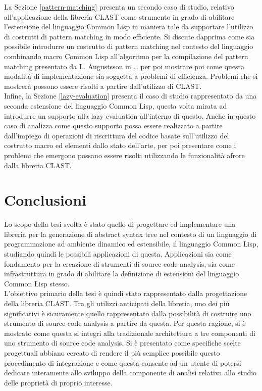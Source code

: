 \documentclass{book}
\begin{document}
La Sezione \ref{pattern-matching} presenta un secondo caso di studio, relativo
all’applicazione della libreria CLAST come strumento in grado di abilitare
l’estensione del linguaggio Common Lisp in maniera tale da supportare l’utilizzo
di costrutti di pattern matching in modo efficiente. Si discute dapprima come
sia possibile introdurre un costrutto di pattern matching nel contesto del
linguaggio combinando macro Common Lisp all’algoritmo per la compilazione del
pattern matching presentato da L. Augustsson in … per poi mostrare poi come
questa modalità di implementazione sia soggetta a problemi di efficienza.
Problemi che si mostrerà possono essere risolti a partire dall'utilizzo di
CLAST.\\

Infine, la Sezione \ref{lazy-evaluation} presenta il caso di studio
rappresentato da una seconda estensione del linguaggio Common Lisp, questa volta
mirata ad introdurre un supporto alla lazy evaluation all’interno di questo.
Anche in questo caso di analizza come questo supporto possa essere realizzato a
partire dall’impiego di operazioni di riscrittura del codice basate
sull’utilizzo del costrutto macro ed elementi dallo stato dell’arte, per poi
presentare come i problemi che emergono possano essere risolti utilizzando le
funzionalità afrore dalla libreria CLAST.





\endgroup

\chapter{Conclusioni}

Lo scopo della tesi svolta è stato quello di progettare ed implementare una
libreria per la generazione di abstract syntax tree nel contesto di un
linguaggio di programmazione ad ambiente dinamico ed estensibile, il linguaggio
Common Lisp, studiando quindi le possibili applicazioni di questa. Applicazioni
sia come fondamento per la creazione di strumenti di source code analysis, sia
come infrastruttura in grado di abilitare la definizione di estensioni del
linguaggio Common Lisp stesso.\\

L'obiettivo primario della tesi è quindi stato rappresentato dalla progettazione
della libreria CLAST. Tra gli utilizzi anticipati della libreria, uno dei più
significativi è sicuramente quello rappresentato dalla possibilità di costruire
uno strumento di source code analysis a partire da questa. Per questa ragione,
si è mostrato come questa si integri alla tradizionale architettura a tre
componenti di uno strumento di source code analysis. Si è presentato come
specifiche scelte progettuali abbiano cercato di rendere il più semplice
possibile questo procedimento di integrazione e come questa consente ad un
utente di potersi dedicare interamente allo sviluppo della componente di analisi
relativa allo studio delle proprietà di proprio interesse.
\end{document}
